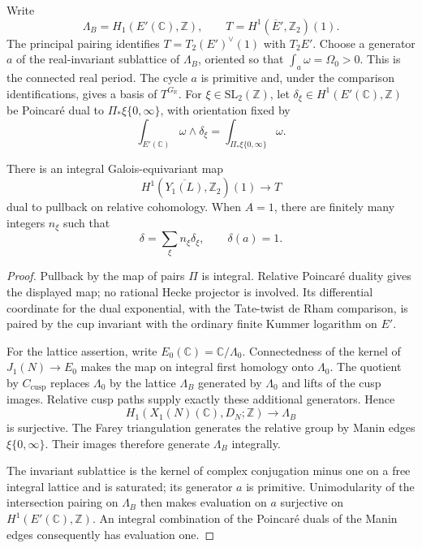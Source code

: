 Write
\[
 \Lambda_B=H_1(E'(\mathbb C),\mathbb Z),\qquad
 T=H^1(\overline E',\mathbb Z_2)(1).
\]
The principal pairing identifies
\(T=T_2(E')^\vee(1)\) with \(T_2E'\).  Choose a generator \(a\) of the
real-invariant sublattice of \(\Lambda_B\), oriented so that
\(\int_a\omega=\Omega_0>0\).  This is the connected real period.  The cycle
\(a\) is primitive and, under the comparison identifications, gives a basis
of \(T^{G_{\mathbb R}}\).  For \(\xi\in\mathrm{SL}_2(\mathbb Z)\), let
\(\delta_\xi\in H^1(E'(\mathbb C),\mathbb Z)\) be Poincaré dual to
\(\Pi_*\xi\{0,\infty\}\), with orientation fixed by
\[
       \int_{E'(\mathbb C)}\omega\wedge\delta_\xi
           =\int_{\Pi_*\xi\{0,\infty\}}\omega.
\]

\begin{lemma}\label{lem:siegel-lattice}
There is an integral Galois-equivariant map
\[
 H^1(\overline{Y_1(L)},\mathbb Z_2)(1)\longrightarrow T
\]
dual to pullback on relative cohomology.  When \(A=1\), there are finitely
many integers \(n_\xi\) such that
\[
              \delta=\sum_\xi n_\xi\delta_\xi,\qquad \delta(a)=1.
\]
\end{lemma}

\begin{proof}
Pullback by the map of pairs \(\Pi\) is integral.  Relative Poincaré duality
gives the displayed map; no rational Hecke projector is involved.  Its
differential coordinate for the dual exponential, with the Tate-twist
de Rham comparison, is paired by the cup invariant with the ordinary finite
Kummer logarithm on \(E'\).

For the lattice assertion, write \(E_0(\mathbb C)=\mathbb C/\Lambda_0\).
Connectedness of the kernel of \(J_1(N)\to E_0\) makes the map on integral
first homology onto \(\Lambda_0\).  The quotient by \(C_{\mathrm{cusp}}\)
replaces \(\Lambda_0\) by the lattice \(\Lambda_B\) generated by
\(\Lambda_0\) and lifts of the cusp images.  Relative cusp paths supply
exactly these additional generators.  Hence
\[
 H_1(X_1(N)(\mathbb C),D_N;\mathbb Z)\longrightarrow\Lambda_B
\]
is surjective.  The Farey triangulation generates the relative group by
Manin edges \(\xi\{0,\infty\}\).  Their images therefore generate
\(\Lambda_B\) integrally.

The invariant sublattice is the kernel of complex conjugation minus one
on a free integral lattice and is saturated; its generator \(a\) is
primitive.  Unimodularity of the intersection pairing on \(\Lambda_B\)
then makes evaluation on \(a\) surjective on \(H^1(E'(\mathbb C),\mathbb Z)\).
An integral combination of the Poincaré duals of the Manin edges consequently
has evaluation one.
\end{proof}

